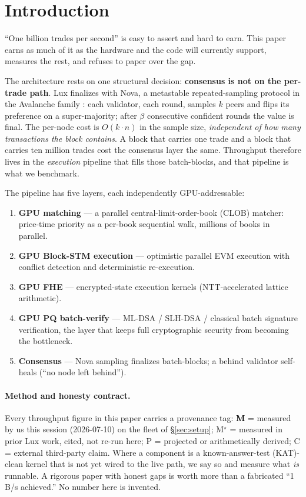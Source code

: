 \documentclass[11pt,a4paper]{article}
\newcommand{\Mnow}{\textbf{\textcolor{black}{M}}}      %
\newcommand{\Mprior}{M$^\star$}                          %
\newcommand{\Proj}{P}                                    %
\newcommand{\Claim}{C}                                   %
\begin{document}
\tableofcontents
\newpage

\section{Introduction}

``One billion trades per second'' is easy to assert and hard to earn.
This paper earns as much of it as the hardware and the code will
currently support, measures the rest, and refuses to paper over the gap.

The architecture rests on one structural decision: \textbf{consensus is
not on the per-trade path}. Lux finalizes with Nova, a metastable
repeated-sampling protocol in the Avalanche family
\cite{avalanche2020,consensusengines}: each validator, each round,
samples $k$ peers and flips its preference on a super-majority; after
$\beta$ consecutive confident rounds the value is final. The per-node
cost is $O(k\cdot n)$ in the sample size, \emph{independent of how many
transactions the block contains}. A block that carries one trade and a
block that carries ten million trades cost the consensus layer the same.
Throughput therefore lives in the \emph{execution} pipeline that fills
those batch-blocks, and that pipeline is what we benchmark.

The pipeline has five layers, each independently GPU-addressable:
\begin{enumerate}[leftmargin=2em,itemsep=1pt]
  \item \textbf{GPU matching} --- a parallel central-limit-order-book
        (CLOB) matcher: price-time priority as a per-book sequential
        walk, millions of books in parallel.
  \item \textbf{GPU Block-STM execution} --- optimistic parallel EVM
        execution with conflict detection and deterministic re-execution.
  \item \textbf{GPU FHE} --- encrypted-state execution kernels
        (NTT-accelerated lattice arithmetic).
  \item \textbf{GPU PQ batch-verify} --- ML-DSA / SLH-DSA / classical
        batch signature verification, the layer that keeps full
        cryptographic security from becoming the bottleneck.
  \item \textbf{Consensus} --- Nova sampling finalizes batch-blocks;
        a behind validator self-heals (``no node left behind'').
\end{enumerate}

\paragraph{Method and honesty contract.}
Every throughput figure in this paper carries a provenance tag:
\Mnow{} = measured by us this session (2026-07-10) on the fleet of
\S\ref{sec:setup}; \Mprior{} = measured in prior Lux work, cited, not
re-run here; \Proj{} = projected or arithmetically derived; \Claim{} =
external third-party claim. Where a component is a known-answer-test
(KAT)-clean kernel that is not yet wired to the live path, we say so and
measure what \emph{is} runnable. A rigorous paper with honest gaps is
worth more than a fabricated ``1\,B/s achieved.'' No number here is
invented.
\end{document}
